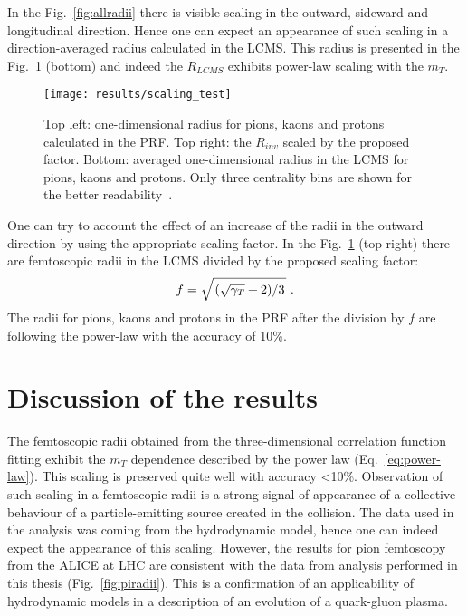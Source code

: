       In the Fig.~\ref{fig:allradii} there is visible scaling in the outward, sideward and longitudinal direction.
      Hence one can expect an appearance of such scaling in a direction-averaged radius calculated in the LCMS.
      This radius is presented in the Fig.~\ref{fig:scaling_test} (bottom) and indeed the $R_{LCMS}$ exhibits power-law scaling with the $m_T$.

      \begin{figure}[b]
        \centering
        \centerline{\texttt{[image: results/scaling\_test]}}
        \caption{Top left: one-dimensional radius for pions, kaons and protons calculated in the PRF. Top right: the $R_{inv}$ scaled by the proposed factor. Bottom: averaged one-dimensional radius in the LCMS for pions, kaons and protons. Only three centrality bins are shown for the better readability~\cite{galazyn}.}
      \label{fig:scaling_test}
      \end{figure}

      One can try to account the effect of an increase of the radii in the outward direction by using the appropriate scaling factor.
      In the Fig.~\ref{fig:scaling_test} (top right) there are femtoscopic radii in the LCMS divided by the proposed scaling factor:
      \begin{equation}
        f = \sqrt{ \left. \left( \sqrt{\gamma_T} + 2 \right) \middle/ 3 \right. }~.
      \end{equation}
      The radii for pions, kaons and protons in the PRF after the division by $f$ are following the power-law with the accuracy of 10\%.



      \FloatBarrier
  \section{Discussion of the results}
    The femtoscopic radii obtained from the three-dimensional correlation function fitting exhibit the $m_T$ dependence described by the power law (Eq.~\ref{eq:power-law}).
    This scaling is preserved quite well with accuracy <10\%.
    Observation of such scaling in a femtoscopic radii is a strong signal of appearance of a collective behaviour of a particle-emitting source created in the collision.
    The data used in the analysis was coming from the hydrodynamic model, hence one can indeed expect the appearance of this scaling.
    However, the results for pion femtoscopy from the ALICE at LHC are consistent with the data from analysis performed in this thesis (Fig.~\ref{fig:piradii}).
    This is a confirmation of an applicability of hydrodynamic models in a description of an evolution of a quark-gluon plasma.

